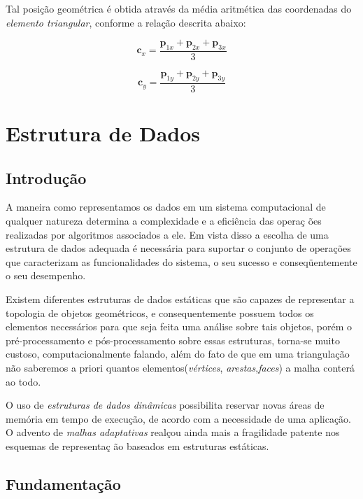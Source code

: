 \documentclass[12pt,a4paper]{book}
\begin{document}
Tal posi\c{c}\~{a}o geom\'{e}trica \'{e} obtida atrav\'{e}s da m\'{e}dia
aritm\'{e}tica das coordenadas do \textit{elemento triangular}, conforme a
rela\c{c}\~{a}o descrita abaixo:

\begin{equation}
\mathbf{c}_{x}=\frac{\mathbf{p}_{1x}+\mathbf{p}_{2x}+\mathbf{p}_{3x}}{3}
\end{equation}

\begin{equation}
\mathbf{c}_{y}=\frac{\mathbf{p}_{1y}+\mathbf{p}_{2y}+\mathbf{p}_{3y}}{3}
\end{equation}


\section{Estrutura de Dados}

\subsection{Introdu\c{c}\~{a}o}

A maneira como representamos os dados em um sistema computacional de
qualquer natureza determina a complexidade e a efici\^{e}ncia das opera\c{c}%
\~{o}es realizadas por algoritmos associados a ele. Em vista disso a escolha
de uma estrutura de dados adequada \'{e} necess\'{a}ria para suportar o
conjunto de opera\c{c}\~{o}es que caracterizam as funcionalidades do
sistema, o seu sucesso e conseq\"{u}entemente o seu desempenho.

Existem diferentes estruturas de dados est\'aticas que s\~ao capazes de representar a topologia de objetos geom\'etricos, e consequentemente possuem todos os elementos necess\'arios para que seja feita uma an\'alise sobre tais objetos, por\'em o pr\'e-processamento e p\'os-processamento sobre essas estruturas, torna-se muito custoso, computacionalmente falando, al\'em do fato de que em uma triangula\c{c}\~{a}o n\~ao saberemos a priori quantos elementos(\textit{v\'ertices}, \textit{arestas},\textit{faces}) a malha conter\'a ao todo.

O uso de \emph{estruturas de dados din\^{a}micas} possibilita reservar novas \'{a}reas de mem\'{o}ria em tempo de execu\c{c}\~{a}o, de acordo com a necessidade de uma aplica\c{c}\~{a}o. O advento de \textit{malhas adaptativas} real\c{c}ou ainda mais a fragilidade patente nos esquemas de representa\c{c}%
\~{a}o baseados em estruturas est\'{a}ticas.

\subsection{Fundamenta\c{c}\~{a}o}
\end{document}
